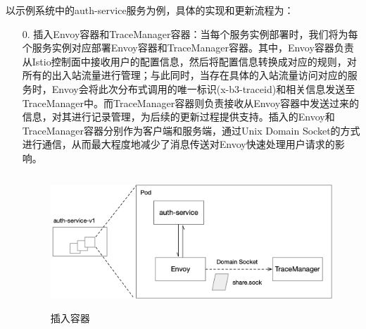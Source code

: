 \documentclass[12pt,a4paper]{article}
\theoremstyle{definition}
\begin{document}
以示例系统中的auth-service服务为例，具体的实现和更新流程为：
\begin{enumerate}
	\item [0.] 插入Envoy容器和TraceManager容器：当每个服务实例部署时，我们将为每个服务实例对应部署Envoy容器和TraceManager容器。其中，Envoy容器负责从Istio控制面中接收用户的配置信息，然后将配置信息转换成对应的规则，对所有的出入站流量进行管理；与此同时，当存在具体的入站流量访问对应的服务时，Envoy会将此次分布式调用的唯一标识(x-b3-traceid)和相关信息发送至TraceManager中。而TraceManager容器则负责接收从Envoy容器中发送过来的信息，对其进行记录管理，为后续的更新过程提供支持。插入的Envoy和TraceManager容器分别作为客户端和服务端，通过Unix Domain Socket的方式进行通信，从而最大程度地减少了消息传送对Envoy快速处理用户请求的影响。
	\begin{figure}[ht]
	 \centering
	 \includegraphics[height=5cm]{images/insert_containers.png}
	 \caption{插入容器}
	 \label{fig:insert_containers}
	\end{figure}


\end{enumerate}
\end{document}
